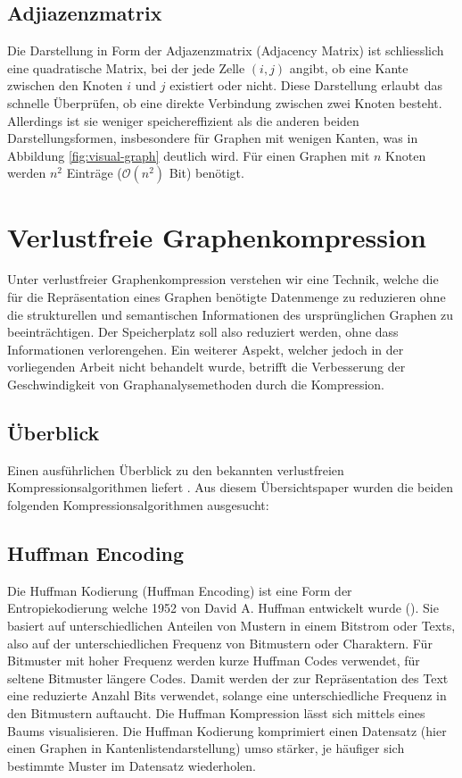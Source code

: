 \documentclass{ffhsthesis}
\begin{document}
\subsection{Adjiazenzmatrix}
Die Darstellung in Form der Adjazenzmatrix (Adjacency Matrix) ist schliesslich eine quadratische Matrix, bei der jede Zelle $(i, j)$ angibt, ob eine Kante zwischen den Knoten $i$ und $j$ existiert oder nicht. Diese Darstellung erlaubt das schnelle Überprüfen, ob eine direkte Verbindung zwischen zwei Knoten besteht. Allerdings ist sie weniger speichereffizient als die anderen beiden Darstellungsformen, insbesondere für Graphen mit wenigen Kanten, was in Abbildung \ref{fig:visual-graph} deutlich wird. Für einen Graphen mit $n$ Knoten werden $n^2$ Einträge ($\mathcal{O}(n^2)$ Bit) benötigt.




\section{Verlustfreie Graphenkompression}
Unter verlustfreier Graphenkompression verstehen wir eine Technik, welche die für die Repräsentation eines Graphen benötigte Datenmenge zu reduzieren ohne die strukturellen und semantischen Informationen des ursprünglichen Graphen zu beeinträchtigen. Der Speicherplatz soll also reduziert werden, ohne dass Informationen verlorengehen. Ein weiterer Aspekt, welcher jedoch in der vorliegenden Arbeit nicht behandelt wurde, betrifft die Verbesserung der Geschwindigkeit von Graphanalysemethoden durch die Kompression. 
\subsection{Überblick}
Einen ausführlichen Überblick zu den bekannten verlustfreien Kompressionsalgorithmen liefert \cite{besta2018survey}. Aus diesem Übersichtspaper wurden die beiden folgenden Kompressionsalgorithmen ausgesucht:
\subsection{Huffman Encoding}
Die Huffman Kodierung (Huffman Encoding) ist eine Form der Entropiekodierung welche 1952 von David A. Huffman entwickelt wurde (\cite{huffman1952method}). Sie basiert auf unterschiedlichen Anteilen von Mustern in einem Bitstrom oder Texts, also auf der unterschiedlichen Frequenz von Bitmustern oder Charaktern. Für Bitmuster mit hoher Frequenz werden kurze Huffman Codes verwendet, für seltene Bitmuster längere Codes. Damit werden der zur Repräsentation des Text eine reduzierte Anzahl Bits verwendet, solange eine unterschiedliche Frequenz in den Bitmustern auftaucht. Die Huffman Kompression lässt sich mittels eines Baums visualisieren. 
Die Huffman Kodierung komprimiert einen Datensatz (hier einen Graphen in Kantenlistendarstellung) umso stärker, je häufiger sich bestimmte Muster im Datensatz wiederholen.
\end{document}
